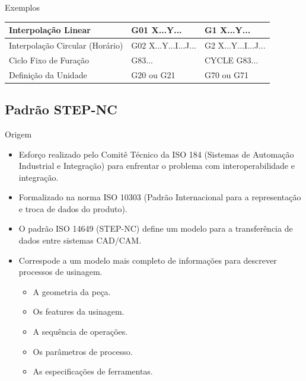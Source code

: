 \documentclass[aspectratio=169]{beamer}
\begin{document}
{\begin{frame}{Exemplos}
\begin{itemize}
{\begin{table}[H]
{\begin{tabular}{p{4.3cm}|p{2.6cm}|p{2.4cm}}
          \hline
          \footnotesize{Interpolação Linear} & 
          \footnotesize{G01 X...Y...} & 
          \footnotesize{G1 X...Y...} \\
      
          \hline
          \footnotesize{Interpolação Circular (Horário)} & 
          \footnotesize{G02 X...Y...I...J...} & 
          \footnotesize{G2 X...Y...I...J...} \\
      
          \hline
          \footnotesize{Ciclo Fixo de Furação} & 
          \footnotesize{G83...} & 
          \footnotesize{CYCLE G83...} \\
      
          \hline
          \footnotesize{Definição da Unidade} & 
          \footnotesize{G20 ou G21 } & 
          \footnotesize{G70 ou G71} \\

          \hline

        \end{tabular}}
      \end{table}
    }    
  \end{itemize}
\end{frame}


\subsection{Padrão STEP-NC}

\begin{frame}{Origem}
  \begin{itemize}
  \item {
    Esforço realizado pelo Comitê Técnico da ISO 184 (Sistemas de Automação Industrial e
    Integração) para enfrentar o problema com interoperabilidade e integração.
  }
  \item {
    Formalizado na norma ISO 10303 (Padrão Internacional para a representação e troca de dados do produto).
  }  
  \item {
    O padrão ISO 14649 (STEP-NC) define um modelo para a transferência de dados entre sistemas CAD/CAM.
  }
  \item {
    Correspode a um modelo mais completo de informações para descrever processos de usinagem.
    \begin{itemize}
      \item A geometria da peça.
      \item Os features da usinagem.
      \item A sequência de operações.
      \item Os parâmetros de processo.
      \item As especificações de ferramentas.
    \end{itemize}
  }
  \end{itemize}
\end{frame}

}
\end{document}
